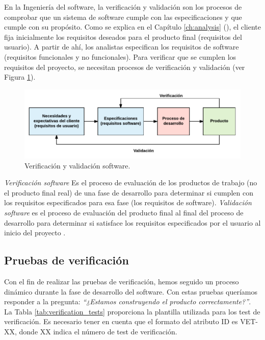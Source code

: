 En la Ingeniería del \Gls{software}, la verificación y validación son los procesos de comprobar que un sistema de \gls{software} cumple con las especificaciones y que cumple con su propósito. Como se explica en el Capítulo \ref{ch:analysis} (\textit{}), el cliente fija inicialmente los requisitos deseados para el producto final (requisitos del usuario). A partir de ahí, los analistas especifican los requisitos de \gls{software} (requisitos funcionales y no funcionales). Para verificar que se cumplen los requisitos del proyecto, se necesitan procesos de verificación y validación (ver Figura \ref{fig:verification_validation}).

\vspace{1cm}

\begin{figure}[htb]
 	\centering
 	\includegraphics[width=12cm]{figures/verificacion_validacion_diagrama}
 	\caption{Verificación y validación \gls{software}.}
	\label{fig:verification_validation}
\end{figure}

\vspace{1cm}

\textit{Verificación \Gls{software}} Es el proceso de evaluación de los productos de trabajo (no el producto final real) de una fase de desarrollo para determinar si cumplen con los requisitos especificados para esa fase (los requisitos de \gls{software}). \textit{Validación \gls{software}} es el proceso de evaluación del producto final al final del proceso de desarrollo para determinar si satisface los requisitos especificados por el usuario al inicio del proyecto \cite{verification}.

\subsection{Pruebas de verificación}

Con el fin de realizar las pruebas de verificación, hemos seguido un proceso dinámico durante la fase de desarrollo del \gls{software}. Con estas pruebas queríamos responder a la pregunta: \emph{``¿Estamos construyendo el producto correctamente?''}. La Tabla \ref{tab:verification_tests} proporciona la plantilla utilizada para los test de verificación. Es necesario tener en cuenta que el formato del atributo ID es VET-XX, donde XX indica el número de test de verificación.
\clearpage

